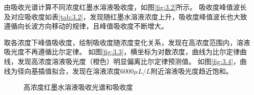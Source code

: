 \documentclass[12pt,a4paper,UTF8]{ctexart}
\begin{document}
由吸收光谱计算不同浓度红墨水溶液吸收度，如图\ref{fig:3.2}所示。
吸收度峰值波长及对应吸收度如表\ref{tab:3.2}，发现随红墨水溶液浓度上升，吸收度峰值波长也大致遵循向长波方向移动的规律，且峰值吸收度不断增大。

取各浓度下峰值吸收度，绘制吸收度随浓度变化关系，发现在高浓度范围内，溶液吸光度不再遵循比尔定律。
如图\ref{fig:3.3}，横坐标为对数浓度，曲线为比尔定律曲线，发现高浓度溶液吸光度（橙色）明显偏离比尔定律预测值。
如图\ref{fig:3.4}，曲线为径向基插值拟合，发现在溶液浓度$6000 \mu L/L$附近溶液吸光度趋近饱和。                                                      
\begin{figure}[htbp]
	\centering
	\caption{高浓度红墨水溶液吸收光谱和吸收度}
\end{figure}
\end{document}
